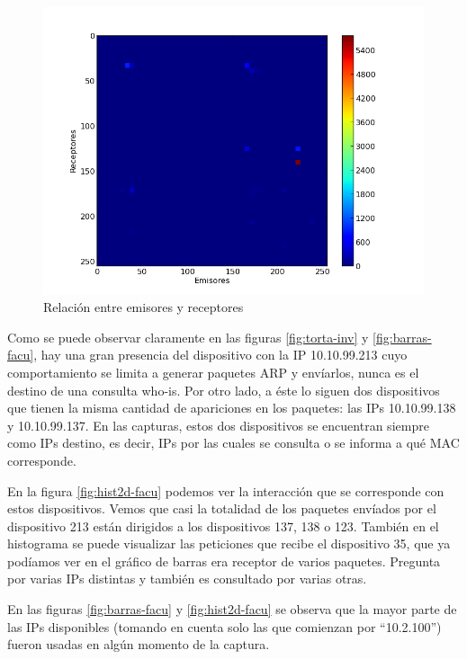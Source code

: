 \begin{figure}[!h]
  \includegraphics[width=\textwidth,keepaspectratio]{graph/hist2d-invgate.png}
  \caption{Relación entre emisores y receptores}
  \label{fig:hist2d-inv}
\end{figure}

Como se puede observar claramente en las figuras \ref{fig:torta-inv} y 
\ref{fig:barras-facu}, hay una gran presencia del dispositivo con la IP 10.10.99.213 cuyo comportamiento se limita a generar paquetes ARP y envíarlos, nunca es el destino de una consulta who-is. Por otro lado, a éste lo siguen dos dispositivos que tienen la misma cantidad de apariciones en los paquetes: las IPs 10.10.99.138 y 10.10.99.137. En las capturas, estos dos dispositivos se encuentran siempre como IPs destino, es decir, IPs por las cuales se consulta o se informa a qué MAC corresponde.
 
En la figura \ref{fig:hist2d-facu} podemos ver la interacción que se corresponde con estos dispositivos. Vemos que casi la totalidad de los paquetes envíados por el dispositivo 213 están dirigidos a los dispositivos 137, 138 o 123. 	
También en el histograma se puede visualizar las peticiones que recibe el dispositivo 35, que ya podíamos ver en el gráfico de barras era receptor de varios paquetes. Pregunta por
varias IPs distintas y también es consultado por varias otras.

En las figuras \ref{fig:barras-facu} y \ref{fig:hist2d-facu} se observa
que la mayor parte de las IPs disponibles (tomando en cuenta solo las que
comienzan por ``10.2.100'') fueron usadas en algún momento de la captura.

